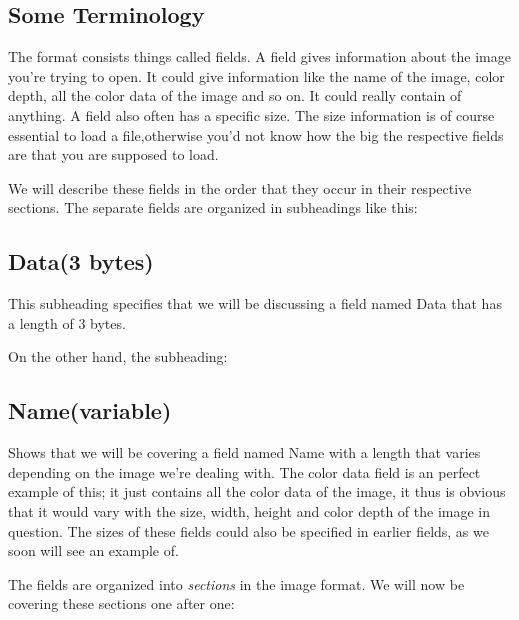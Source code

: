 \begin{refsection}
  \section{Some Terminology}

  The \tga format consists things called fields. A field
  gives information about the image you're trying to open. It could
  give information like the name of the image, color depth, all the
  color data of the image and so on. It could really contain of
  anything. A field also often has a specific size. The size
  information is of course essential to load a \tga file,otherwise
  you'd not know how the big the respective fields are that you are
  supposed to load.

  \newcommand{\plural}[3]{\ifstrequal{#1}{1}{#2}{#3}}
  \newcommand{\fieldlength}[1]{\ifstrequal{#1}{0}{variable}{#1 \plural{#1}{byte}{bytes}}}
  \newcommand{\imgfield}[2]{\subsection*{#1(\fieldlength{#2})}}
  \newcommand{\imgsubfield}[2]{\subsubsection*{#1(\fieldlength{#2})}}

  We will describe these fields in the order that they occur in their
  respective sections. The separate fields are organized in
  subheadings like this:

  \imgfield{Data}{3}

  This subheading specifies that we will be discussing a field named
  Data that has a length of 3 bytes.

  On the other hand, the subheading:

  \imgfield{Name}{0}

  Shows that we will be covering a field named Name with a length that
  varies depending on the image we're dealing with. The color data
  field is an perfect example of this; it just contains all the color
  data of the image, it thus is obvious that it would vary with the
  size, width, height and color depth of the image in question. The
  sizes of these fields could also be specified in earlier fields, as
  we soon will see an example of.

  The fields are organized into \textit{sections} in
  the image format. We will now be covering these sections one after
  one:


\end{refsection}
